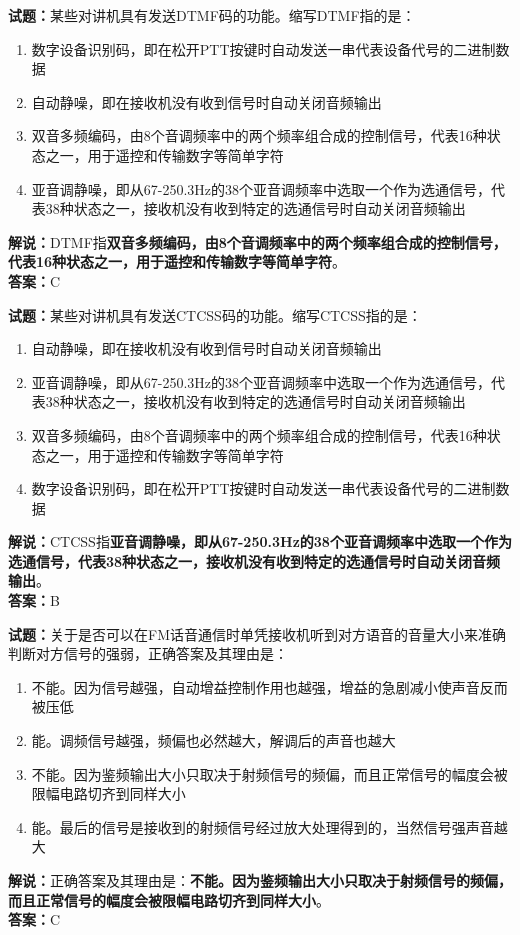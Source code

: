 \documentclass{ctexbook}
\begin{document}
\bigskip


\noindent\textbf{试题：}某些对讲机具有发送DTMF码的功能。缩写DTMF指的是：
\begin{enumerate}[leftmargin=3em]
\item 数字设备识别码，即在松开PTT按键时自动发送一串代表设备代号的二进制数据
\item 自动静噪，即在接收机没有收到信号时自动关闭音频输出
\item 双音多频编码，由8个音调频率中的两个频率组合成的控制信号，代表16种状态之一，用于遥控和传输数字等简单字符
\item 亚音调静噪，即从67-250.3Hz的38个亚音调频率中选取一个作为选通信号，代表38种状态之一，接收机没有收到特定的选通信号时自动关闭音频输出
\end{enumerate}
\noindent\textbf{解说：}DTMF指\textbf{双音多频编码，由8个音调频率中的两个频率组合成的控制信号，代表16种状态之一，用于遥控和传输数字等简单字符}。\\\noindent\textbf{答案：}C



\bigskip


\noindent\textbf{试题：}某些对讲机具有发送CTCSS码的功能。缩写CTCSS指的是：
\begin{enumerate}[leftmargin=3em]
\item 自动静噪，即在接收机没有收到信号时自动关闭音频输出
\item 亚音调静噪，即从67-250.3Hz的38个亚音调频率中选取一个作为选通信号，代表38种状态之一，接收机没有收到特定的选通信号时自动关闭音频输出
\item 双音多频编码，由8个音调频率中的两个频率组合成的控制信号，代表16种状态之一，用于遥控和传输数字等简单字符
\item 数字设备识别码，即在松开PTT按键时自动发送一串代表设备代号的二进制数据
\end{enumerate}
\noindent\textbf{解说：}CTCSS指\textbf{亚音调静噪，即从67-250.3Hz的38个亚音调频率中选取一个作为选通信号，代表38种状态之一，接收机没有收到特定的选通信号时自动关闭音频输出}。\\\noindent\textbf{答案：}B



\bigskip


\noindent\textbf{试题：}关于是否可以在FM话音通信时单凭接收机听到对方语音的音量大小来准确判断对方信号的强弱，正确答案及其理由是：
\begin{enumerate}[leftmargin=3em]
\item 不能。因为信号越强，自动增益控制作用也越强，增益的急剧减小使声音反而被压低
\item 能。调频信号越强，频偏也必然越大，解调后的声音也越大
\item 不能。因为鉴频输出大小只取决于射频信号的频偏，而且正常信号的幅度会被限幅电路切齐到同样大小
\item 能。最后的信号是接收到的射频信号经过放大处理得到的，当然信号强声音越大
\end{enumerate}
\noindent\textbf{解说：}正确答案及其理由是：\textbf{不能。因为鉴频输出大小只取决于射频信号的频偏，而且正常信号的幅度会被限幅电路切齐到同样大小}。\\\noindent\textbf{答案：}C
\end{document}
